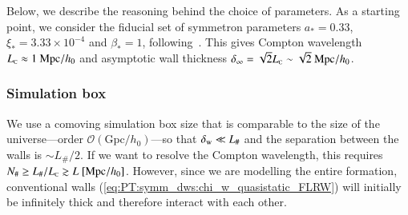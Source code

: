 




Below, we describe the reasoning behind the choice of parameters. As a starting point, we consider the fiducial set of symmetron parameters $a_\ast =0.33$, $\xi_\ast = 3.33\times 10^{-4}$ and $\beta_\ast = 1$, following~\citet{christiansenCosmologicalSimulationsPhase2024}. This gives Compton wavelength $L_{\text{\tiny{C}}}\approx 1~\mathrm{Mpc}/h_0$ and asymptotic wall thickness $\delta_\infty = \sqrt{2} L_{\text{\tiny{C}}}\sim \sqrt{2} ~\mathrm{Mpc}/h_0$.


\subsubsection{Simulation box}

    We use a comoving simulation box size that is comparable to the size of the universe---order $\mathscr{O}(\mathrm{Gpc}/h_0)$---so that $\delta_\mathrm{w}\ll L_\#$ and the separation between the walls is $\sim L_{\#}/2$. If we want to resolve the Compton wavelength, this requires $N_\# \geq L_\#/L_{\text{\tiny{C}}} \gtrsim L~[\mathrm{Mpc}/h_0]$. However, since we are modelling the entire formation, conventional walls (\cref{eq:PT:symm_dws:chi_w_quasistatic_FLRW}) will initially be infinitely thick and therefore interact with each other. 


